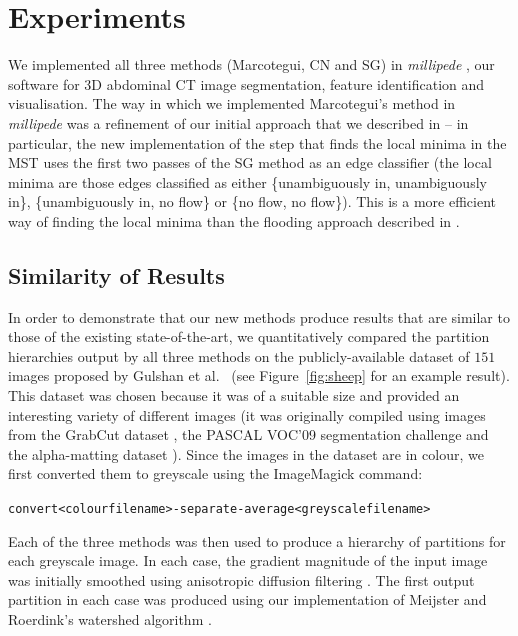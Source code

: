 \documentclass[preprint,a4paper]{elsarticle}
\begin{document}
\section{Experiments}
\label{sec:experiments}

We implemented all three methods (Marcotegui, CN and SG) in \emph{millipede} \cite{millipede}, our software for 3D abdominal CT image segmentation, feature identification and visualisation. The way in which we implemented Marcotegui's method in \emph{millipede} was a refinement of our initial approach that we described in \cite{golodetz08} -- in particular, the new implementation of the step that finds the local minima in the MST uses the first two passes of the SG method as an edge classifier (the local minima are those edges classified as either \{unambiguously in, unambiguously in\}, \{unambiguously in, no flow\} or \{no flow, no flow\}). This is a more efficient way of finding the local minima than the flooding approach described in \cite{golodetz08}.

\subsection{Similarity of Results}
\label{subsec:experiments-similarity}

In order to demonstrate that our new methods produce results that are similar to those of the existing state-of-the-art, we quantitatively compared the partition hierarchies output by all three methods on the publicly-available dataset of $151$ images proposed by Gulshan et al.\ \cite{gulshan10} (see Figure~\ref{fig:sheep} for an example result). This dataset was chosen because it was of a suitable size and provided an interesting variety of different images (it was originally compiled using images from the GrabCut dataset \cite{rother04}, the PASCAL VOC'09 segmentation challenge \cite{everingham09} and the alpha-matting dataset \cite{rhemann09}). Since the images in the dataset are in colour, we first converted them to greyscale using the ImageMagick \cite{imagemagick} command:
%
\begin{alltt}\begin{center}
convert <colour filename> -separate -average <greyscale filename>
\end{center}\end{alltt}
%
Each of the three methods was then used to produce a hierarchy of partitions for each greyscale image. In each case, the gradient magnitude of the input image was initially smoothed using anisotropic diffusion filtering \cite{perona90}. The first output partition in each case was produced using our implementation of Meijster and Roerdink's watershed algorithm \cite{meijster98}.
\end{document}
